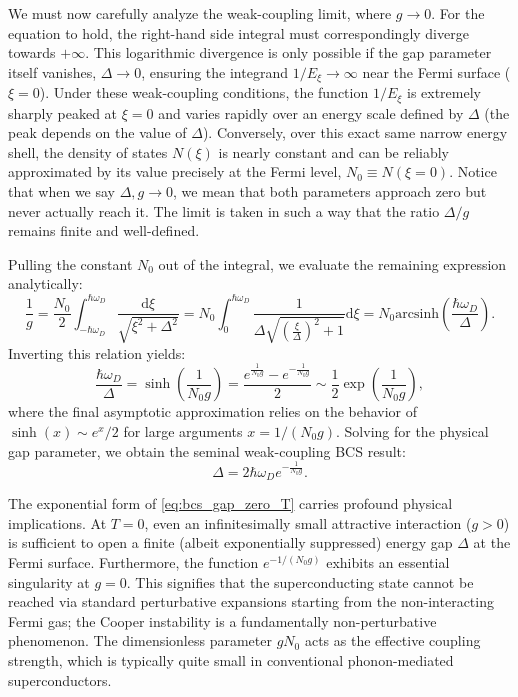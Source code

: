 We must now carefully analyze the weak-coupling limit, where \( g \to 0 \). For the equation to hold, the right-hand side integral must correspondingly diverge towards \( +\infty \). This logarithmic divergence is only possible if the gap parameter itself vanishes, \( \Delta \to 0 \), ensuring the integrand \( 1/E_{\xi} \to \infty \) near the Fermi surface (\( \xi = 0 \)). Under these weak-coupling conditions, the function \( 1/E_{\xi} \) is extremely sharply peaked at \( \xi = 0 \) and varies rapidly over an energy scale defined by \( \Delta \) (the peak depends on the value of \( \Delta \)). Conversely, over this exact same narrow energy shell, the density of states \( N(\xi) \) is nearly constant and can be reliably approximated by its value precisely at the Fermi level, \( N_0 \equiv N(\xi=0) \). Notice that when we say \(\Delta, g \to 0\), we mean that both parameters approach zero but never actually reach it. The limit is taken in such a way that the ratio \( \Delta/g \) remains finite and well-defined.

Pulling the constant \( N_0 \) out of the integral, we evaluate the remaining expression analytically:
\[
    \frac{1}{g} = \frac{N_0}{2} \int_{-\hbar\omega_D}^{\hbar\omega_D} \frac{\mathrm{d} \xi}{\sqrt{\xi^2 + \Delta^2}} = N_0 \int_{0}^{\hbar\omega_D} \frac{1}{\Delta \sqrt{(\frac{\xi}{\Delta})^2 + 1}} \mathrm{d} \xi = N_0 \text{arcsinh}\left(\frac{\hbar\omega_D}{\Delta}\right).
\]
Inverting this relation yields:
\[
    \frac{\hbar\omega_D}{\Delta} = \sinh\left(\frac{1}{N_0 g}\right) = \frac{e^{\frac{1}{N_0 g}} - e^{-\frac{1}{N_0 g}}}{2} \sim \frac{1}{2} \exp\left(\frac{1}{N_0 g}\right),
\]
where the final asymptotic approximation relies on the behavior of \( \sinh(x) \sim e^x / 2 \) for large arguments \( x = 1/(N_0 g) \). Solving for the physical gap parameter, we obtain the seminal weak-coupling BCS result:
\begin{equation} \label{eq:bcs_gap_zero_T}
    \Delta = 2\hbar\omega_D e^{-\frac{1}{N_0 g}}.
\end{equation}

\begin{remark}
    The exponential form of \eqref{eq:bcs_gap_zero_T} carries profound physical implications. At \( T=0 \), even an infinitesimally small attractive interaction (\( g > 0 \)) is sufficient to open a finite (albeit exponentially suppressed) energy gap \( \Delta \) at the Fermi surface. Furthermore, the function \( e^{-1/(N_0 g)} \) exhibits an essential singularity at \( g=0 \). This signifies that the superconducting state cannot be reached via standard perturbative expansions starting from the non-interacting Fermi gas; the Cooper instability is a fundamentally non-perturbative phenomenon. The dimensionless parameter \( g N_0 \) acts as the effective coupling strength, which is typically quite small in conventional phonon-mediated superconductors.
\end{remark}

